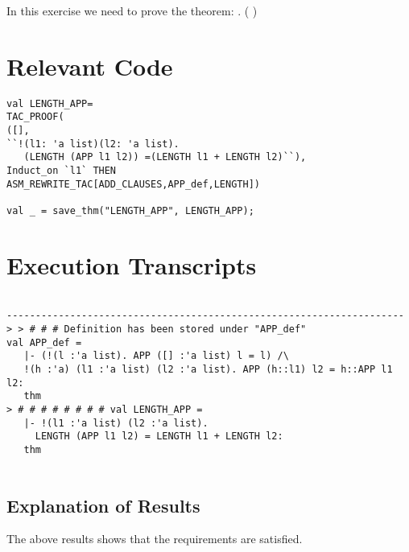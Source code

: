 \documentclass{report}
\begin{document}
In this exercise we need to prove the theorem:
\HOLTokenTurnstile{} \HOLSymConst{\HOLTokenForall{}} .  (  ) \HOLSymConst{=}   \HOLSymConst{+}  

\section{Relevant Code}
\label{sec:relevant-code-1}
 \lstset{frameround=fftt}
\begin{lstlisting}[frame=tRBL]
val LENGTH_APP=
TAC_PROOF(
([],
``!(l1: 'a list)(l2: 'a list).
   (LENGTH (APP l1 l2)) =(LENGTH l1 + LENGTH l2)``),
Induct_on `l1` THEN
ASM_REWRITE_TAC[ADD_CLAUSES,APP_def,LENGTH])

val _ = save_thm("LENGTH_APP", LENGTH_APP);
\end{lstlisting}


\section{Execution Transcripts}
\label{sec:exec-transcr-1}

\setcounter{sessioncount}{0}
\begin{session}
  \begin{scriptsize}
\begin{verbatim}

---------------------------------------------------------------------
> > # # # Definition has been stored under "APP_def"
val APP_def =
   |- (!(l :'a list). APP ([] :'a list) l = l) /\
   !(h :'a) (l1 :'a list) (l2 :'a list). APP (h::l1) l2 = h::APP l1 l2:
   thm
> # # # # # # # # val LENGTH_APP =
   |- !(l1 :'a list) (l2 :'a list).
     LENGTH (APP l1 l2) = LENGTH l1 + LENGTH l2:
   thm
 
\end{verbatim}
  \end{scriptsize}
\end{session}

\subsection{Explanation of Results}
\label{sec:explanation-results-1}
The above results shows that the requirements are satisfied.

\end{document}
